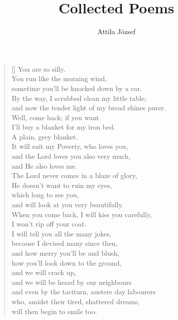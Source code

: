 \documentclass[a4paper,12pt,twoside,final]{book}
\title{Collected Poems}
\author{Attila József}
\begin{document}
\maketitle


\chapter{}


\settowidth{\versewidth}{and now the tender light of my bread shines purer.}

\begin{verse}[\versewidth]
  You are so silly. \\
  You run like the morning wind, \\
  sometime you'll be knocked down by a car. \\
  By the way, I scrubbed clean my little table, \\
  and now the tender light of my bread shines purer. \\
  Well, come back; if you want \\
  I'll buy a blanket for my iron bed. \\
  A plain, grey blanket. \\
  It will suit my Poverty, who loves you, \\
  and the Lord loves you also very much, \\
  and He also loves me. \\
  The Lord never comes in a blaze of glory, \\
  He doesn't want to ruin my eyes, \\
  which long to see you, \\
  and will look at you very beautifully. \\
  When you come back, I will kiss you carefully, \\
  I won't rip off your coat. \\
  I will tell you all the many jokes, \\
  because I devised many since then, \\
  and how merry you'll be and blush, \\
  how you'll look down to the ground, \\
  and we will crack up, \\
  and we will be heard by our neighbours \\
  and even by the taciturn, austere day labourers \\
  who, amidst their tired, shattered dreams, \\
  will then begin to smile too. \\
\end{verse}
\end{document}
